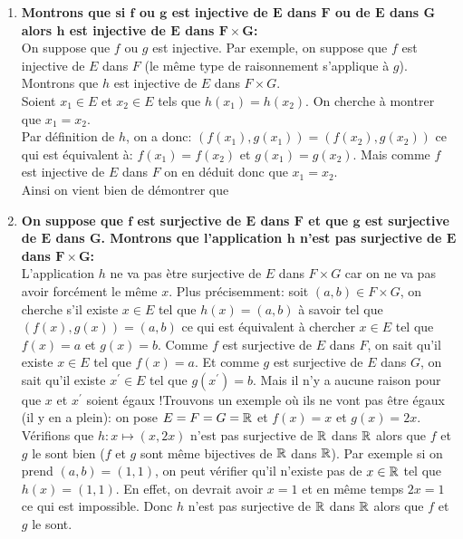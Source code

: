 \documentclass[a4paper, 11pt,reqno]{article}
\begin{document}
\begin{correction} \;
	\begin{enumerate}
		\item \textbf{Montrons que si $\mathbf{f}$ ou $\mathbf{g}$ est injective  de $\mathbf{E}$ dans $\mathbf{F}$ ou de $\mathbf{E}$ dans $\mathbf{G}$ alors $\mathbf{h}$ est injective de $\mathbf{E}$ dans $\mathbf{F\times G}$:}\\
		      \noindent On suppose que $f$ ou $g$ est injective. Par exemple, on suppose que $f$ est injective de $E$ dans $F$ (le m\^{e}me type de raisonnement s'applique \`{a} $g$). Montrons que $h$ est injective de $E$ dans $F\times G$.\\
		      \noindent Soient $x_1\in E$ et $x_2\in E$ tels que $h(x_1)=h(x_2)$. On cherche \`{a} montrer que $x_1=x_2$.\\
		      \noindent Par d\'efinition de $h$, on a donc: $(f(x_1),g(x_1))=(f(x_2),g(x_2))$ ce qui est \'equivalent \`{a}: $f(x_1)=f(x_2)$ et
		      $g(x_1)=g(x_2)$. Mais comme $f$ est injective de $E$ dans $F$ on en d\'eduit donc que $x_1=x_2$. \\
		      \noindent Ainsi on vient bien de d\'emontrer que 
		\item \textbf{On suppose que $\mathbf{f}$ est surjective de $\mathbf{E}$ dans $\mathbf{F}$ et que $\mathbf{g}$ est surjective de $\mathbf{E}$ dans $\mathbf{G}$. Montrons que l'application $\mathbf{h}$ n'est pas surjective de $\mathbf{E}$ dans $\mathbf{F\times G}$:}\\
		      \noindent L'application $h$ ne va pas \`{e}tre surjective de $E$ dans $F\times G$ car on ne va pas avoir forc\'ement le m\^{e}me $x$. Plus pr\'ecisemment: soit $(a,b)\in F\times G$, on cherche s'il existe $x\in E$ tel que $h(x)=(a,b)$ \`{a} savoir tel que $(f(x),g(x))=(a,b)$ ce qui est \'equivalent \`{a} chercher $x\in E$ tel que $f(x)=a$ et $g(x)=b$. Comme $f$ est surjective de $E$ dans $F$, on sait qu'il existe $x\in E$ tel que $f(x)=a$. Et comme $g$ est surjective de $E$ dans $G$, on sait qu'il existe $x^{\prime}\in E$ tel que $g(x^{\prime})=b$. Mais il n'y a aucune raison pour que $x$ et $x^{\prime}$ soient \'egaux !Trouvons un exemple o\`{u} ils ne vont pas \^{e}tre \'egaux (il y en a plein): on pose $E=F=G=\mathbb{R}$ et $f(x)=x$ et $g(x)=2x$. V\'erifions que $h: x\mapsto (x,2x)$ n'est pas surjective de $\mathbb{R}$ dans $\mathbb{R}$ alors que $f$ et $g$ le sont bien ($f$ et $g$ sont m\^{e}me bijectives de $\mathbb{R}$ dans $\mathbb{R}$). Par exemple si on prend $(a,b)=(1,1)$, on peut v\'erifier qu'il n'existe pas de $x\in \mathbb{R}$ tel que $h(x)=(1,1)$. En effet, on devrait avoir $x=1$ et en m\^{e}me temps $2x=1$ ce qui est impossible. Donc $h$ n'est pas surjective de $\mathbb{R}$ dans $\mathbb{R}$ alors que $f$ et $g$ le sont.
	\end{enumerate}
\end{correction}
\end{document}

